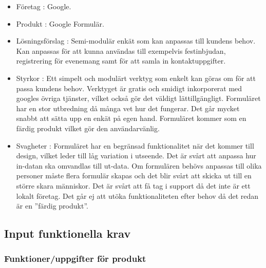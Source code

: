 \documentclass[12pt]{article}
\begin{document}
\begin{itemize}
    \item Företag : Google.
     \item Produkt : Google Formulär.
     \item Lösningsförslag : Semi-modulär enkät som kan anpassas till kundens behov. Kan anpassas för att kunna användas till exempelvis festinbjudan, registrering för evenemang samt för att samla in kontaktuppgifter.
   

    \item Styrkor : Ett simpelt och modulärt verktyg som enkelt kan göras om för att passa kundens behov. Verktyget är gratis och smidigt inkorporerat med googles övriga tjänster,  vilket också gör det väldigt lättillgängligt. Formuläret har en stor utbredning då många vet hur det fungerar. Det går mycket snabbt att sätta upp en enkät på egen hand. Formuläret kommer som en färdig produkt vilket gör den användarvänlig.
    
    \item Svagheter : Formuläret har en begränsad funktionalitet när det kommer till design, vilket leder till låg variation i utseende. Det är svårt att anpassa hur in-datan ska omvandlas till ut-data. Om formulären behövs anpassas till olika personer måste flera formulär skapas och det blir svårt att  skicka ut till en större skara människor. Det är svårt att få tag i support då det inte är ett lokalt företag. Det går ej att utöka funktionaliteten efter behov då det redan är en ”färdig produkt”.
\end{itemize}
    
\subsection{Input funktionella krav}
\subsubsection{Funktioner/uppgifter för produkt}
  
\end{document}

